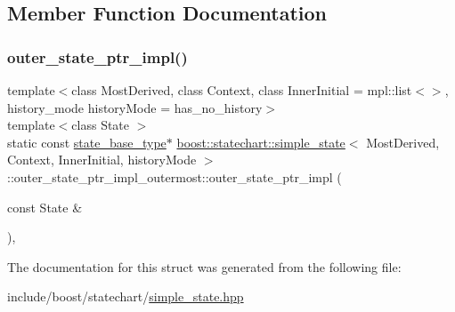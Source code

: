 \subsection{Member Function Documentation}
\mbox{\label{structboost_1_1statechart_1_1simple__state_1_1outer__state__ptr__impl__outermost_a82c1160b2f758246aa1157850fdc54fb}} 
\subsubsection{\texorpdfstring{outer\+\_\+state\+\_\+ptr\+\_\+impl()}{outer\_state\_ptr\_impl()}}
{\footnotesize\ttfamily template$<$class Most\+Derived, class Context, class Inner\+Initial = mpl\+::list$<$$>$, history\+\_\+mode history\+Mode = has\+\_\+no\+\_\+history$>$ \\
template$<$class State $>$ \\
static const \mbox{\hyperlink{classboost_1_1statechart_1_1simple__state_ae4af81f8eae996cc418efa3387af0ef6}{state\+\_\+base\+\_\+type}}$\ast$ \mbox{\hyperlink{classboost_1_1statechart_1_1simple__state}{boost\+::statechart\+::simple\+\_\+state}}$<$ Most\+Derived, Context, Inner\+Initial, history\+Mode $>$\+::outer\+\_\+state\+\_\+ptr\+\_\+impl\+\_\+outermost\+::outer\+\_\+state\+\_\+ptr\+\_\+impl (\begin{DoxyParamCaption}\item[{const State \&}]{ }\end{DoxyParamCaption})\hspace{0.3cm}{\ttfamily [inline]}, {\ttfamily [static]}}



The documentation for this struct was generated from the following file\+:\begin{DoxyCompactItemize}
\item 
include/boost/statechart/\mbox{\hyperlink{simple__state_8hpp}{simple\+\_\+state.\+hpp}}\end{DoxyCompactItemize}
